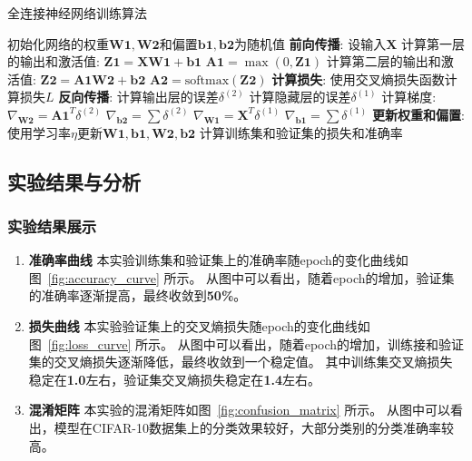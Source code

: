 \documentclass[12pt]{article}
\begin{document}
\begin{algorithm}
  \caption{全连接神经网络训练算法}
  \label{FullyConnectedNN Training Algorithm}
  \begin{algorithmic}[1]
    \State 初始化网络的权重$\mathbf{W1}, \mathbf{W2}$和偏置$\mathbf{b1}, \mathbf{b2}$为随机值
    \State \textbf{前向传播}:
    \State \quad 设输入$\mathbf{X}$
    \State \quad 计算第一层的输出和激活值:
    \State \quad \quad $\mathbf{Z1} = \mathbf{X} \mathbf{W1} + \mathbf{b1}$
    \State \quad \quad $\mathbf{A1} = \max(0, \mathbf{Z1})$ 
    \State \quad 计算第二层的输出和激活值:
    \State \quad \quad $\mathbf{Z2} = \mathbf{A1} \mathbf{W2} + \mathbf{b2}$
    \State \quad \quad $\mathbf{A2} = \text{softmax}(\mathbf{Z2})$
    \State \textbf{计算损失}:
    \State \quad 使用交叉熵损失函数计算损失$L$
    \State \textbf{反向传播}:
    \State \quad 计算输出层的误差$\delta^{(2)}$
    \State \quad 计算隐藏层的误差$\delta^{(1)}$
    \State \quad 计算梯度:
    \State \quad \quad $\nabla_{\mathbf{W2}} = \mathbf{A1}^T \delta^{(2)}$
    \State \quad \quad $\nabla_{\mathbf{b2}} = \sum \delta^{(2)}$
    \State \quad \quad $\nabla_{\mathbf{W1}} = \mathbf{X}^T \delta^{(1)}$
    \State \quad \quad $\nabla_{\mathbf{b1}} = \sum \delta^{(1)}$
    \State \textbf{更新权重和偏置}:
    \State \quad 使用学习率$\eta$更新$\mathbf{W1}, \mathbf{b1}, \mathbf{W2}, \mathbf{b2}$
    \EndFor
    \State 计算训练集和验证集的损失和准确率
    \EndFor
    \EndProcedure
  \end{algorithmic}
\end{algorithm}

\subsection{实验结果与分析}

\subsubsection{实验结果展示}

\begin{enumerate}
  \item \textbf{准确率曲线} 本实验训练集和验证集上的准确率随epoch的变化曲线如图~\ref{fig:accuracy_curve} 所示。
        从图中可以看出，随着epoch的增加，验证集的准确率逐渐提高，最终收敛到\textbf{50\%}。
  \item \textbf{损失曲线} 本实验验证集上的交叉熵损失随epoch的变化曲线如图~\ref{fig:loss_curve} 所示。
        从图中可以看出，随着epoch的增加，训练接和验证集的交叉熵损失逐渐降低，最终收敛到一个稳定值。
        其中训练集交叉熵损失稳定在\textbf{1.0}左右，验证集交叉熵损失稳定在\textbf{1.4}左右。
  \item \textbf{混淆矩阵} 本实验的混淆矩阵如图~\ref{fig:confusion_matrix} 所示。
        从图中可以看出，模型在CIFAR-10数据集上的分类效果较好，大部分类别的分类准确率较高。
\end{enumerate}
\end{document}

